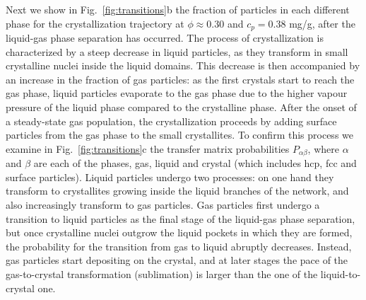 \documentclass[preprint,amsmath,amssymb,superscriptaddress]{revtex4}
\begin{document}
Next we show in Fig.~\ref{fig:transitions}b the fraction of particles in each different phase for the crystallization trajectory at
$\phi\approx 0.30$ and $c_p=0.38$ mg/g, after the liquid-gas phase separation has occurred. The process of crystallization is characterized 
by a steep decrease in liquid particles, as they transform in small crystalline nuclei inside the liquid domains. This decrease
is then accompanied by an increase in the fraction of gas particles: as the first crystals start to reach the gas phase, liquid particles evaporate 
to the gas phase due to the higher vapour pressure of the liquid phase compared to the crystalline phase. After the onset
of a steady-state gas population, the crystallization proceeds by adding surface particles from the gas phase to the small crystallites. To confirm this process we
examine in Fig.~\ref{fig:transitions}c the transfer matrix probabilities $P_{\alpha\beta}$, where $\alpha$ and $\beta$ are each of the 
phases, gas, liquid and crystal (which includes hcp, fcc and surface particles). Liquid particles undergo two processes: on one
hand they transform to crystallites growing inside the liquid branches of the network, and also increasingly transform to gas particles.
Gas particles first undergo a transition to liquid particles as the final stage of the liquid-gas phase separation, but once
crystalline nuclei outgrow the liquid pockets in which they are formed, the probability for the transition from gas to liquid
abruptly decreases. Instead, gas particles start depositing on the crystal, and at later stages the pace of the gas-to-crystal transformation (sublimation)
is larger than the one of the liquid-to-crystal one.
\end{document}
